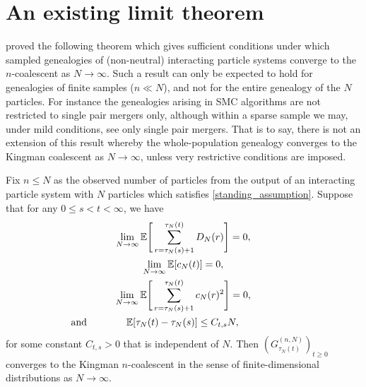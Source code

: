 \section{An existing limit theorem}
\textcite{koskela2018} proved the following theorem which gives sufficient conditions under which sampled genealogies of (non-neutral) interacting particle systems converge to the $n$-coalescent as $N\to\infty$.
Such a result can only be expected to hold for genealogies of finite samples ($n\ll N$), and not for the entire genealogy of the $N$ particles. 
For instance the genealogies arising in SMC algorithms are not restricted to single pair mergers only, although within a sparse sample we may, under mild conditions, see only single pair mergers. 
That is to say, there is not an extension of this result whereby the whole-population genealogy converges to the Kingman coalescent as $N\to\infty$, unless very restrictive conditions are imposed.

\begin{theorem}\label{thm:kjjs_mainthm}
Fix $n \leq N$ as the observed number of particles from the output of an interacting particle system with $N$ particles which satisfies \ref{standing_assumption}.
Suppose that for any $0 \leq s < t < \infty$, we have
\begin{gather}\label{eq:kjjs_big_merger_bound}
\lim_{ N \rightarrow \infty } \E\Bigg[ \sum_{ r = \tau_N( s ) + 1 }^{ \tau_N( t ) } D_N( r ) \Bigg] = 0, \\
\label{eq:kjjs_binary_bound}
\lim_{ N \rightarrow \infty } \E[ c_N( t ) ] = 0, \\
\label{eq:kjjs_binary_bound_2}
\lim_{ N \rightarrow \infty } \E\Bigg[ \sum_{ r = \tau_N( s ) + 1 }^{ \tau_N( t ) } c_N( r )^2 \Bigg] = 0, \\
\label{eq:kjjs_tau_bound}
\text{and}\qquad\qquad\E[ \tau_N( t ) - \tau_N( s ) ] \leq C_{ t, s } N,\qquad\qquad\phantom{\text{and}}
\end{gather}
for some constant $C_{ t, s } > 0$ that is independent of $N$.
Then $( G_{ \tau_N( t ) }^{ ( n, N ) } )_{ t \geq 0 }$ converges to the Kingman $n$-coalescent in the sense of finite-dimensional distributions as $N \rightarrow \infty$. 
\end{theorem}

